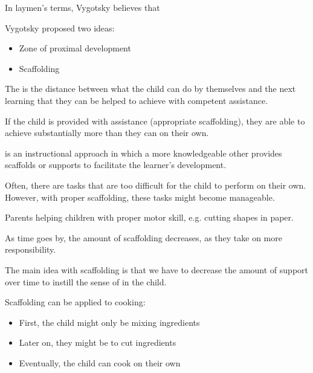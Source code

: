 \documentclass[../main/main.tex]{subfiles}
\begin{document}
\begin{remark}
In laymen's terms, Vygotsky believes that
\end{remark}
Vygotsky proposed two ideas:
\begin{itemize}
  \item Zone of proximal development
        \item Scaffolding
\end{itemize}
\begin{definition} 
The  is the distance between what the child can do by themselves and the next learning that they can be helped to achieve with competent assistance.
\end{definition}
\begin{remark}
If the child is provided with assistance (appropriate scaffolding), they are able to achieve substantially more than they can on their own.
\end{remark}
\begin{definition}
 is an instructional approach in which a more knowledgeable other provides scaffolds or supports to facilitate the learner's development.
\end{definition}
\begin{remark}
Often, there are tasks that are too difficult for the child to perform on their own. However, with proper scaffolding, these tasks might become manageable.
\end{remark}
\begin{example}
Parents helping children with proper motor skill, e.g. cutting shapes in paper.
\end{example}
As time goes by, the amount of scaffolding decreases, as they take on more responsibility.
\begin{remark}
The main idea with scaffolding is that we have to decrease the amount of support over time to instill the sense of  in the child.
\end{remark}
\begin{example}
Scaffolding can be applied to cooking:
\begin{itemize}
\item First, the child might only be mixing ingredients
  \item Later on, they might be to cut ingredients
    \item Eventually, the child can cook on their own
\end{itemize}
\end{example}
\end{document}
